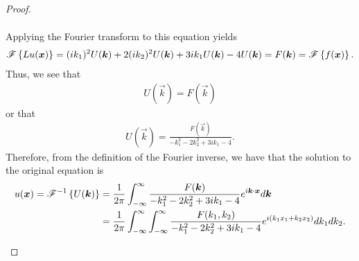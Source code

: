 \begin{proof}
\begin{enumerate}
\begin{align*}
      \end{align*}
      Applying the Fourier transform to this equation yields
      \begin{align*}
        \mathscr{F}\left\{ {Lu(\boldsymbol{x})} \right\}
        = (i k_1)^2 U(\boldsymbol{k}) + 2(ik_2)^2U(\boldsymbol{k}) + 3i k_1 U(\boldsymbol{k}) - 4 U(\boldsymbol{k})
        = F(\boldsymbol{k})  = \mathscr{F}\left\{ {f(\boldsymbol{x})} \right\}.
      \end{align*}
      Thus, we see that
      \begin{align*}
        [-k_1^2 - 2k_2^2 + 3ik_1- 4]U(\vec{k}) = F(\vec{k})
      \end{align*}
      or that
      \begin{align*}
        U(\vec{k}) = \frac{F(\vec{k})}{-k_1^2 - 2k_2^2 + 3ik_1- 4}.
      \end{align*}
      Therefore, from the definition of the Fourier inverse, we have that the solution to the original
      equation is
      \begin{align*}
        u(\boldsymbol{x}) = \mathscr{F}^{-1}\left\{ {U(\boldsymbol{k})} \right\}
        &= \frac{1}{2\pi}\int_{-\infty}^\infty \frac{F(\boldsymbol{k})}{-k_1^2 - 2k_2^2 + 3ik_1- 4} e^{i \boldsymbol{k}\cdot \boldsymbol{x}} d\boldsymbol{k} \\
        &= \frac{1}{2\pi}\int_{-\infty}^\infty\int_{-\infty}^\infty \frac{F(k_1, k_2)}{-k_1^2 - 2k_2^2 + 3ik_1- 4} e^{i (k_1x_1 + k_2x_2)} dk_1dk_2.
      \end{align*}
  \end{enumerate}
\end{proof}
\newpage
